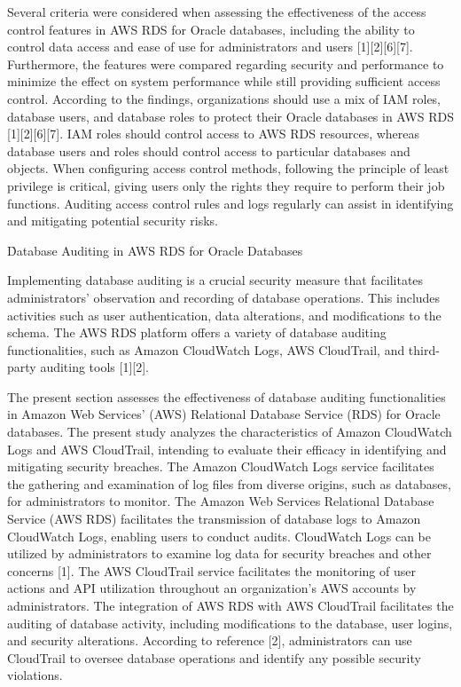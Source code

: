 \documentclass{ieee}
\begin{document}
Several criteria were considered when assessing the effectiveness of the access control features in AWS RDS for Oracle databases, including the ability to control data access and ease of use for administrators and users [1][2][6][7]. Furthermore, the features were compared regarding security and performance to minimize the effect on system performance while still providing sufficient access control. According to the findings, organizations should use a mix of IAM roles, database users, and database roles to protect their Oracle databases in AWS RDS [1][2][6][7]. IAM roles should control access to AWS RDS resources, whereas database users and roles should control access to particular databases and objects. When configuring access control methods, following the principle of least privilege is critical, giving users only the rights they require to perform their job functions. Auditing access control rules and logs regularly can assist in identifying and mitigating potential security risks.

\h{Database Auditing in AWS RDS for Oracle Databases}

Implementing database auditing is a crucial security measure that facilitates administrators' observation and recording of database operations. This includes activities such as user authentication, data alterations, and modifications to the schema. The AWS RDS platform offers a variety of database auditing functionalities, such as Amazon CloudWatch Logs, AWS CloudTrail, and third-party auditing tools [1][2].


The present section assesses the effectiveness of database auditing functionalities in Amazon Web Services' (AWS) Relational Database Service (RDS) for Oracle databases. The present study analyzes the characteristics of Amazon CloudWatch Logs and AWS CloudTrail, intending to evaluate their efficacy in identifying and mitigating security breaches. The Amazon CloudWatch Logs service facilitates the gathering and examination of log files from diverse origins, such as databases, for administrators to monitor. The Amazon Web Services Relational Database Service (AWS RDS) facilitates the transmission of database logs to Amazon CloudWatch Logs, enabling users to conduct audits. CloudWatch Logs can be utilized by administrators to examine log data for security breaches and other concerns [1]. The AWS CloudTrail service facilitates the monitoring of user actions and API utilization throughout an organization's AWS accounts by administrators. The integration of AWS RDS with AWS CloudTrail facilitates the auditing of database activity, including modifications to the database, user logins, and security alterations. According to reference [2], administrators can use CloudTrail to oversee database operations and identify any possible security violations.
\end{document}

